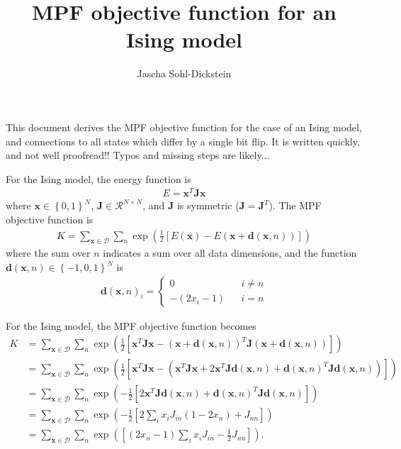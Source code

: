 \documentclass{article}
\title{MPF objective function for an Ising model}
\author{
Jascha Sohl-Dickstein
}
\newcommand{\mb}{\mathbf}
\begin{document}
\maketitle

This document derives the MPF objective function for the case of an Ising model, and connections to all states which differ by a single bit flip.  It is written quickly, and not well proofread!!  Typos and missing steps are likely...

For the Ising model, the energy function is
\begin{align}
E = \mb x^T \mb J \mb x
\end{align}
where $\mb x \in \left\{ 0, 1 \right\}^N$, $\mb J \in \mathcal R^{N\times N}$, and $\mb J$ is symmetric ($\mb J = \mb J^T$).
The MPF objective function is
\begin{align}
K = \sum_{\mb x \in \mathcal D} \sum_n \exp\left( \frac{1}{2}\left[
E(\mb x) - E(\mb x + {\mb d}(\mb x, n)) \right] \right)
\end{align}
where the sum over $n$ indicates a sum over all data dimensions, and the function ${\mb d}(\mb x, n) \in \left\{ -1, 0, 1 \right\}^N$ is
\begin{align}
{\mb d}(\mb x, n)_i =
	\left\{\begin{array}{ccc}
0 & & i \neq n \\
-(2 x_i - 1) & & i = n
	\end{array}\right.
\end{align}

For the Ising model, the MPF objective function becomes
\begin{align}
K & = \sum_{\mb x \in \mathcal D} \sum_n \exp\left( \frac{1}{2}\left[
\mb x^T \mb J \mb x
- (\mb x + {\mb d}(\mb x, n))^T \mb J (\mb x + {\mb d}(\mb x, n))
\right] \right) \\
& = \sum_{\mb x \in \mathcal D} \sum_n \exp\left( \frac{1}{2}\left[
\mb x^T \mb J \mb x
- \left(
\mb x^T \mb J \mb x
+
2 \mb x^T \mb J {\mb d}(\mb x, n)
+
{\mb d}(\mb x, n)^T \mb J {\mb d}(\mb x, n)
\right) 
\right] \right)
 \\
& = \sum_{\mb x \in \mathcal D} \sum_n \exp\left( -\frac{1}{2}\left[
2 \mb x^T \mb J {\mb d}(\mb x, n)
+
{\mb d}(\mb x, n)^T \mb J {\mb d}(\mb x, n)
\right]
\right)  \\
& = \sum_{\mb x \in \mathcal D} \sum_n \exp\left( -\frac{1}{2}\left[
2 \sum_i x_i J_{in} \left( 1 - 2 x_n  \right)
+
J_{nn}
\right]
\right)\\
& = \sum_{\mb x \in \mathcal D} \sum_n \exp\left( \left[
\left( 2 x_n - 1 \right) \sum_i x_i J_{in}
-
\frac{1}{2}J_{nn}
\right]
\right)
.
\end{align}
\end{document}

